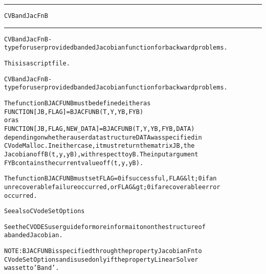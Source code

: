 \begin{samepage}
\hrule
\begin{center}
{\large \verb!CVBandJacFnB!}
\label{p:CVBandJacFnB}
\end{center}
\hrule\vspace{0.1in}



\begin{alltt}
CVBandJacFnB - type for user provided banded Jacobian function for backward problems.
\end{alltt}

\end{samepage}



\begin{samepage}


\begin{alltt}
This is a script file. 
\end{alltt}

\end{samepage}



\begin{alltt}
CVBandJacFnB - type for user provided banded Jacobian function for backward problems.

   The function BJACFUNB must be defined either as
        FUNCTION [JB, FLAG] = BJACFUNB(T, Y, YB, FYB)
   or as
        FUNCTION [JB, FLAG, NEW_DATA] = BJACFUNB(T, Y, YB, FYB, DATA)
   depending on whether a user data structure DATA was specified in
   CVodeMalloc. In either case, it must return the matrix JB, the
   Jacobian of fB(t,y,yB), with respect to yB. The input argument
   FYB contains the current value of f(t,y,yB).

   The function BJACFUNB must set FLAG=0 if successful, FLAG&lt;0 if an
   unrecoverable failure occurred, or FLAG&gt;0 if a recoverable error
   occurred.

   See also CVodeSetOptions

   See the CVODES user guide for more informaiton on the structure of
   a banded Jacobian.

   NOTE: BJACFUNB is specified through the property JacobianFn to
   CVodeSetOptions and is used only if the property LinearSolver
   was set to 'Band'.
\end{alltt}






\vspace{0.1in}